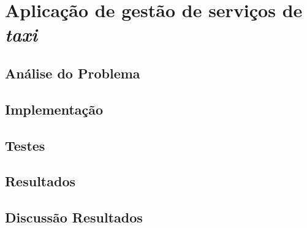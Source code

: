 \chapter{Aplicação de gestão de serviços de \emph{taxi}}

\section{Análise do Problema}




\section{Implementação}




\section{Testes}


\section{Resultados}

\section{Discussão Resultados}




